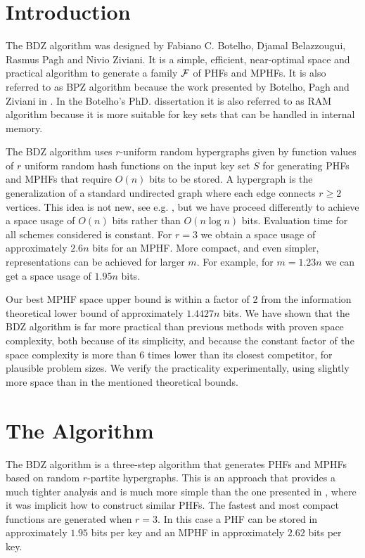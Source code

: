 \section{Introduction} \label{sec:introduction}

The BDZ algorithm was designed by Fabiano C. Botelho, Djamal Belazzougui, Rasmus Pagh and Nivio Ziviani.
It is a simple, efficient, near-optimal space and practical
algorithm to generate a family $\cal F$ of PHFs and MPHFs.
It is also referred to as BPZ algorithm because the work presented
by Botelho, Pagh and Ziviani in \cite{bpz07}.
In the Botelho's PhD. dissertation \cite{b08} it is also referred to as RAM algorithm
because it is more suitable for key sets that can be handled in internal memory.

The BDZ algorithm uses $r$-uniform random hypergraphs
given by function values of $r$
uniform random hash functions on the input key set $S$ for generating PHFs and MPHFs that
require $O(n)$ bits to be stored.
A hypergraph is the generalization of a standard undirected
graph where each edge connects $r\geq 2$ vertices.
This idea is not new, see e.g. \cite{mwhc96},
but we have proceed differently to achieve
a space usage of $O(n)$ bits rather than $O(n\log n)$ bits.
Evaluation time for all schemes considered is constant. 
For $r=3$ we obtain a space usage of approximately $2.6n$ bits for 
an MPHF. More compact, and even simpler, representations can be
achieved for larger $m$. For example, for $m=1.23n$ we can get a
space usage of $1.95n$ bits.

Our best MPHF space upper bound is within a
factor of 2 from the information theoretical lower bound of approximately
$1.4427n$ bits. We have shown that the BDZ algorithm is far more
practical than previous methods with proven space complexity, both
because of its simplicity, and because the constant factor of the
space complexity is more than 6 times lower than its closest
competitor, for plausible problem sizes. We verify the practicality
experimentally, using slightly more space than in the mentioned
theoretical bounds.

\section{The Algorithm}

The BDZ algorithm is a three-step algorithm that generates PHFs and MPHFs based on
random $r$-partite hypergraphs.
This is an approach that provides a much tighter analysis and is
much more simple than the one presented in
\cite{ckrt04}, where it was implicit how to construct 
similar PHFs.
The fastest and most compact functions
are generated when $r=3$.
In this case a PHF can be stored in
approximately $1.95$ bits per key and 
an MPHF in approximately 
$2.62$ bits per key.

